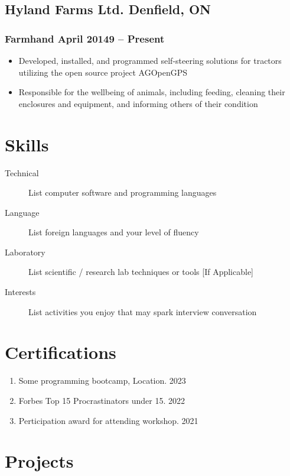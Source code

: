 \documentclass[11pt]{article}
\newcommand{\rside}[1]{
  \hfill {\normalfont\color{accent} #1}%
}
\begin{document}
\subsection{Hyland Farms Ltd. \rside{Denfield, ON}}
\subsubsection{Farmhand \rside{April 20149 -- Present}}
\begin{itemize}
  \item Developed, installed, and programmed self-steering solutions for tractors utilizing the open source project AGOpenGPS
  \item Responsible for the wellbeing of animals, including feeding, cleaning their enclosures and equipment, and informing others of their condition
\end{itemize}


\section{Skills}
\begin{description}
  \item[Technical] List computer software and programming languages 
  \item[Language] List foreign languages and your level of fluency
  \item[Laboratory] List scientific / research lab techniques or tools [If Applicable]
  \item[Interests] List activities you enjoy that may spark interview conversation
\end{description}


\section{Certifications}
\begin{enumerate}[label=\null, left=0pt..0pt, itemsep=0pt]
  \item Some programming bootcamp, Location. \rside{2023}
  \item Forbes Top 15 Procrastinators under 15. \rside{2022}
  \item Perticipation award for attending workshop. \rside{2021}
\end{enumerate}


\section{Projects}
\end{document}
